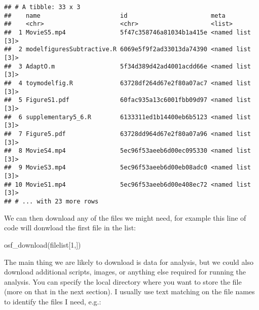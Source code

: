 \documentclass[
]{article}
\newenvironment{Shaded}{\begin{snugshade}}{\end{snugshade}}
\newcommand{\CommentTok}[1]{\textcolor[rgb]{0.56,0.35,0.01}{\textit{#1}}}
\newcommand{\ControlFlowTok}[1]{\textcolor[rgb]{0.13,0.29,0.53}{\textbf{#1}}}
\newcommand{\DecValTok}[1]{\textcolor[rgb]{0.00,0.00,0.81}{#1}}
\newcommand{\FunctionTok}[1]{\textcolor[rgb]{0.00,0.00,0.00}{#1}}
\newcommand{\NormalTok}[1]{#1}
\newcommand{\OtherTok}[1]{\textcolor[rgb]{0.56,0.35,0.01}{#1}}
\newcommand{\SpecialCharTok}[1]{\textcolor[rgb]{0.00,0.00,0.00}{#1}}
\newcommand{\StringTok}[1]{\textcolor[rgb]{0.31,0.60,0.02}{#1}}
\begin{document}
\begin{verbatim}
## # A tibble: 33 x 3
##    name                      id                       meta            
##    <chr>                     <chr>                    <list>          
##  1 MovieS5.mp4               5f47c358746a81034b1a415e <named list [3]>
##  2 modelfiguresSubtractive.R 6069e5f9f2ad33013da74390 <named list [3]>
##  3 AdaptO.m                  5f34d389d42ad4001acdd66e <named list [3]>
##  4 toymodelfig.R             63728df264d67e2f80a07ac7 <named list [3]>
##  5 FigureS1.pdf              60fac935a13c6001fbb09d97 <named list [3]>
##  6 supplementary5_6.R        6133311ed1b14400eb6b5123 <named list [3]>
##  7 Figure5.pdf               63728dd964d67e2f80a07a96 <named list [3]>
##  8 MovieS4.mp4               5ec96f53aeeb6d00ec095330 <named list [3]>
##  9 MovieS3.mp4               5ec96f53aeeb6d00eb08adc0 <named list [3]>
## 10 MovieS1.mp4               5ec96f53aeeb6d00e408ec72 <named list [3]>
## # ... with 23 more rows
\end{verbatim}

We can then download any of the files we might need, for example this line of code will donwload the first file in the list:

\begin{Shaded}
\begin{Highlighting}[]
\FunctionTok{osf\_download}\NormalTok{(filelist[}\DecValTok{1}\NormalTok{,])}
\end{Highlighting}
\end{Shaded}

The main thing we are likely to download is data for analysis, but we could also download additional scripts, images, or anything else required for running the analysis. You can specify the local directory where you want to store the file (more on that in the next section). I usually use text matching on the file names to identify the files I need, e.g.:

\begin{Shaded}
\end{Shaded}
\end{document}

